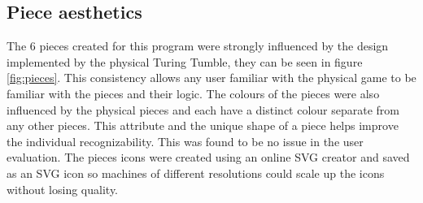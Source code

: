 \documentclass{l4proj}
\begin{document}
\subsection{Piece aesthetics}
The 6 pieces created for this program were strongly influenced by the design implemented by the physical Turing Tumble, they can be seen in figure \ref{fig:pieces}. This consistency allows any user familiar with the physical game to be familiar with the pieces and their logic. The colours of the pieces were also influenced by the physical pieces and each have a distinct colour separate from any other pieces. This attribute and the unique shape of a piece helps improve the individual recognizability. This was found to be no issue in the user evaluation. The pieces icons were created using an online SVG creator \citep{noauthor_method_nodate} and saved as an SVG icon so machines of different resolutions could scale up the icons without losing quality. 
\end{document}
